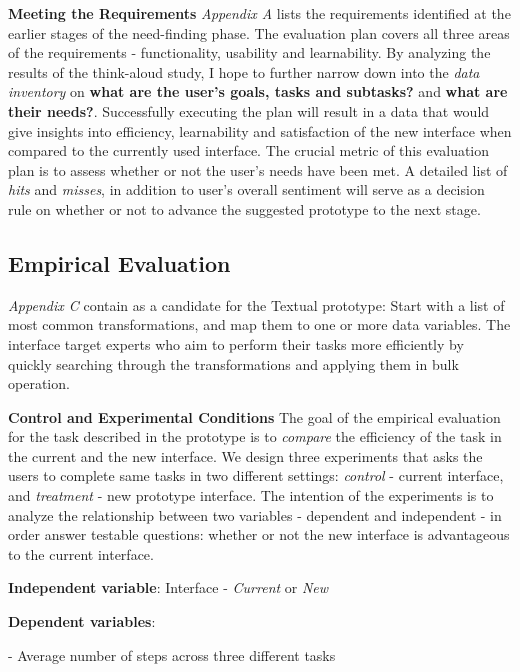 \documentclass[12pt,letterpaper]{article}
\begin{document}
\textbf{Meeting the Requirements} \textit{Appendix A} lists the requirements identified at the earlier stages of the need-finding phase. The evaluation plan covers all three areas of the requirements - functionality, usability and learnability. By analyzing the results of the think-aloud study, I hope to further narrow down into the \textit{data inventory} on \textbf{what are the user's goals, tasks and subtasks?} and \textbf{what are their needs?}.  Successfully executing the plan will result in a data that would give insights into efficiency, learnability and satisfaction of the new interface when compared to the currently used interface. The crucial metric of this evaluation plan is to assess whether or not the user's needs have been met. A detailed list of \textit{hits} and \textit{misses}, in addition to user's overall sentiment will serve as a decision rule on whether or not to advance the suggested prototype to the next stage. 


\subsection*{Empirical Evaluation}
\textit{Appendix C}  contain as a candidate for the Textual prototype: Start with a list of most common transformations, and map them to one or more data variables. The interface target experts who aim to perform their tasks more efficiently by quickly searching through the transformations and applying them in bulk operation.

\textbf{Control and Experimental Conditions}
The goal of the empirical evaluation for the task described in the prototype is to \textit{compare} the efficiency of the task in the current and the new interface. We design three experiments that asks the users to complete same tasks in two different settings: \textit{control} - current interface, and \textit{treatment} - new prototype interface. The intention of the experiments is to analyze the relationship between two variables - dependent and independent - in order answer testable questions:  whether or not the new interface is advantageous to the current interface.

\hspace{10mm} \textbf{Independent variable}: Interface - \textit{Current} or \textit{New}  

\hspace{10mm} \textbf{Dependent variables}: 


\hspace{20mm} - Average number of steps across three different tasks 
\end{document}
